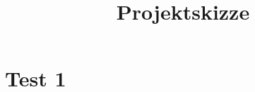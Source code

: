 \documentclass[11pt, a4paper]{report}
\title{Projektskizze}
\begin{document}
\frontmatter
\tableofcontents\thispagestyle{plain}
\newpage
\listoffigures\thispagestyle{plain}
\newpage
\listoftables\thispagestyle{plain}
\mainmatter
\chapter{Test 1}
\label{cha:test_1}
	\blindtext
	\newpage
	\blindtext
\Blinddocument
\Blinddocument
\Blinddocument
\Blinddocument
\Blinddocument
\Blinddocument
\Blinddocument
\Blinddocument
\Blinddocument
\end{document}
